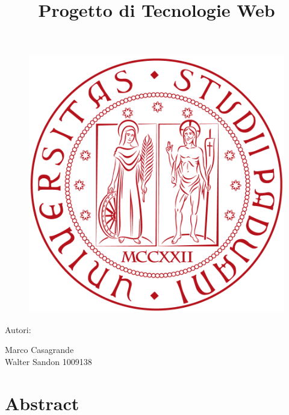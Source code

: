 \documentclass[11pt]{article}
\title{Progetto di Tecnologie Web}
\begin{document}
	\maketitle
	\begin{figure}[h]
		\centering
		\includegraphics[width=0.7\linewidth]{logo-unipd.png}
	\end{figure}
	\begin{center}{\fontsize{20}{10}\selectfont Autori:}\end{center}
	\begin{center}{\fontsize{20}{30}\selectfont 
			Marco Casagrande
			\\ Walter Sandon 1009138
			
			}\end{center}
	
	\newpage
	\tableofcontents
	\newpage
	\listoffigures
	\newpage
	
	\section{Abstract}
	
\end{document}
